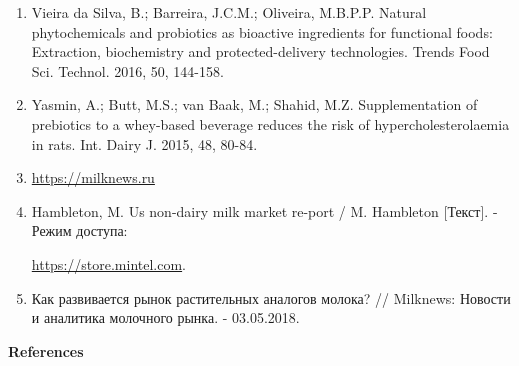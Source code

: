 \begin{enumerate}
\item
Vieira da Silva, B.; Barreira, J.C.M.; Oliveira, M.B.P.P. Natural
phytochemicals and probiotics as bioactive ingredients for functional
foods: Extraction, biochemistry and protected-delivery technologies.
Trends Food Sci. Technol. 2016, 50, 144-158.

\item
Yasmin, A.; Butt, M.S.; van Baak, M.; Shahid, M.Z. Supplementation of
prebiotics to a whey-based beverage reduces the risk of
hypercholesterolaemia in rats. Int. Dairy J. 2015, 48, 80-84.

\item
\href{https://milknews.ru/longridy/rastitelniye-analogi-moloka.html}{https://milknews.ru}

\item
Hambleton, M. Us non-dairy milk market re-port / M. Hambleton
{[}Текст{]}. - Режим доступа:

\href{https://store.mintel.com/US-NON-DAIRY-MILK-MAR-KET-REPORT}{https://store.mintel.com}.

\item
Как развивается рынок растительных аналогов молока? // Milknews:
Новости и аналитика молочного рынка. - 03.05.2018.
\end{enumerate}

\begin{center}
{\bfseries References}
\end{center}


